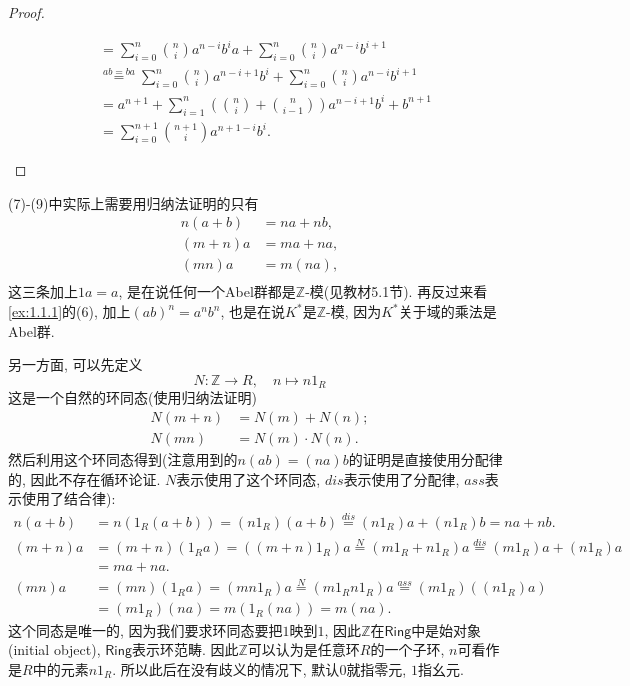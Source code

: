 \begin{proof}
\begin{enumerate}[(1)]
\[\begin{aligned}
        &= \sum_{i = 0}^{n} \binom{n}{i} a^{n - i}b^ia + \sum_{i = 0}^{n} \binom{n}{i} a^{n - i}b^{i + 1}\\
        &\overset{ab = ba}= \sum_{i = 0}^{n} \binom{n}{i} a^{n - i + 1}b^i + \sum_{i = 0}^{n} \binom{n}{i} a^{n - i}b^{i + 1}\\
        &= a^{n + 1} + \sum_{i = 1}^{n} \left(\binom{n}{i} + \binom{n}{i - 1}\right) a^{n - i + 1}b^{i} + b^{n + 1}\\
        &= \sum_{i = 0}^{n + 1} \binom{n + 1}{i} a^{n + 1 - i}b^i.
    \end{aligned}
    \]
    \end{enumerate}
\end{proof}

\begin{remark}
    (7)-(9)中实际上需要用归纳法证明的只有
\[
\begin{aligned}
    n(a + b) &= na + nb,\\
    (m + n)a &= ma + na,\\
    (mn)a &= m(na),\\
\end{aligned}
\]
这三条加上$1a = a$, 是在说任何一个Abel群都是$\mathbb{Z}$-模(见教材5.1节). 再反过来看\ref{ex:1.1.1}的(6), 加上$(ab)^n = a^nb^n$, 也是在说$K^*$是$\mathbb{Z}$-模, 因为$K^*$关于域的乘法是Abel群.

另一方面, 可以先定义
\[
    N: \mathbb{Z} \to R,\quad n \mapsto n1_R
\]
这是一个自然的环同态(使用归纳法证明)
\[
    \begin{aligned}
        N(m + n) &= N(m) + N(n);\\
        N(mn) &= N(m) \cdot N(n).
    \end{aligned}
\]
然后利用这个环同态得到(注意用到的$n(ab) = (na)b$的证明是直接使用分配律的, 因此不存在循环论证. $N$表示使用了这个环同态, $dis$表示使用了分配律, $ass$表示使用了结合律):
\[
    \begin{aligned}
        n(a + b) &= n(1_R(a + b)) = (n1_R)(a + b) \overset{dis}= (n1_R)a + (n1_R)b = na + nb.\\
        (m + n)a &= (m + n)(1_Ra) = ((m + n)1_R)a \overset{N}= (m1_R + n1_R)a \overset{dis}= (m1_R)a + (n1_R)a\\
        &= ma + na.\\
        (mn)a &= (mn)(1_Ra) = (mn1_R)a \overset{N}= (m1_Rn1_R)a \overset{ass}= (m1_R)((n1_R)a)\\
        &= (m1_R)(na) = m(1_R(na)) = m(na).
    \end{aligned}
\]
这个同态是唯一的, 因为我们要求环同态要把$1$映到$1$, 因此$\mathbb{Z}$在$\mathsf{Ring}$中是始对象(initial object), $\mathsf{Ring}$表示环范畴. 因此$\mathbb{Z}$可以认为是任意环$R$的一个子环, $n$可看作是$R$中的元素$n1_R$. 所以此后在没有歧义的情况下, 默认$0$就指零元, $1$指幺元.
\end{remark}

